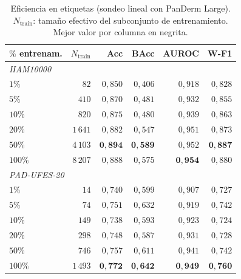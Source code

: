 \begin{table}[htbp]
\centering
\footnotesize
\setlength{\tabcolsep}{4pt}
\renewcommand{\arraystretch}{0.95}
\caption{Eficiencia en etiquetas (sondeo lineal con PanDerm Large).
$N_{\mathrm{train}}$: tamaño efectivo del subconjunto de
entrenamiento. Mejor valor por columna en negrita.}
\label{tab:label-eff}
\begin{tabular}{lrrrrr}
\hline
$\%$ entrenam.  & $N_{\mathrm{train}}$ & Acc           & BAcc          & AUROC         & W-F1 \\
\hline
\multicolumn{6}{l}{\textit{HAM10000}} \\
$1\%$           & $82$                 & $0{,}850$     & $0{,}406$     & $0{,}918$     & $0{,}828$ \\
$5\%$           & $410$                & $0{,}870$     & $0{,}481$     & $0{,}932$     & $0{,}855$ \\
$10\%$          & $820$                & $0{,}875$     & $0{,}480$     & $0{,}939$     & $0{,}863$ \\
$20\%$          & $1\,641$             & $0{,}882$     & $0{,}547$     & $0{,}951$     & $0{,}873$ \\
$50\%$          & $4\,103$             & $\mathbf{0{,}894}$ & $\mathbf{0{,}589}$ & $0{,}952$ & $\mathbf{0{,}887}$ \\
$100\%$         & $8\,207$             & $0{,}888$     & $0{,}575$     & $\mathbf{0{,}954}$ & $0{,}880$ \\
\hline
\multicolumn{6}{l}{\textit{PAD-UFES-20}} \\
$1\%$           & $14$                 & $0{,}740$     & $0{,}599$     & $0{,}907$     & $0{,}727$ \\
$5\%$           & $74$                 & $0{,}751$     & $0{,}632$     & $0{,}919$     & $0{,}742$ \\
$10\%$          & $149$                & $0{,}738$     & $0{,}593$     & $0{,}923$     & $0{,}724$ \\
$20\%$          & $298$                & $0{,}748$     & $0{,}587$     & $0{,}931$     & $0{,}728$ \\
$50\%$          & $746$                & $0{,}757$     & $0{,}611$     & $0{,}941$     & $0{,}742$ \\
$100\%$         & $1\,493$             & $\mathbf{0{,}772}$ & $\mathbf{0{,}642}$ & $\mathbf{0{,}949}$ & $\mathbf{0{,}760}$ \\
\hline
\end{tabular}
\end{table}

